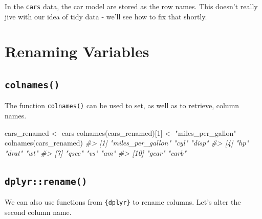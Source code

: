 \documentclass[
  12pt,
]{book}
\newenvironment{Shaded}{\begin{snugshade}}{\end{snugshade}}
\newcommand{\CommentTok}[1]{\textcolor[rgb]{0.56,0.35,0.01}{\textit{#1}}}
\newcommand{\DecValTok}[1]{\textcolor[rgb]{0.00,0.00,0.81}{#1}}
\newcommand{\FunctionTok}[1]{\textcolor[rgb]{0.00,0.00,0.00}{#1}}
\newcommand{\NormalTok}[1]{#1}
\newcommand{\OtherTok}[1]{\textcolor[rgb]{0.56,0.35,0.01}{#1}}
\newcommand{\StringTok}[1]{\textcolor[rgb]{0.31,0.60,0.02}{#1}}
\begin{document}
In the \texttt{cars} data, the car model are stored as the row names. This doesn't really jive with our idea of tidy data - we'll see how to fix that shortly.

\hypertarget{renaming-variables}{%
\section{Renaming Variables}\label{renaming-variables}}

\hypertarget{colnames}{%
\subsection{\texorpdfstring{\texttt{colnames()}}{colnames()}}\label{colnames}}

The function \texttt{colnames()} can be used to set, as well as to retrieve, column names.

\begin{Shaded}
\begin{Highlighting}[]
\NormalTok{cars\_renamed }\OtherTok{\textless{}{-}}\NormalTok{ cars }
\FunctionTok{colnames}\NormalTok{(cars\_renamed)[}\DecValTok{1}\NormalTok{] }\OtherTok{\textless{}{-}} \StringTok{"miles\_per\_gallon"}
\FunctionTok{colnames}\NormalTok{(cars\_renamed)}
\CommentTok{\#\textgreater{}  [1] "miles\_per\_gallon" "cyl"              "disp"            }
\CommentTok{\#\textgreater{}  [4] "hp"               "drat"             "wt"              }
\CommentTok{\#\textgreater{}  [7] "qsec"             "vs"               "am"              }
\CommentTok{\#\textgreater{} [10] "gear"             "carb"}
\end{Highlighting}
\end{Shaded}

\hypertarget{dplyrrename}{%
\subsection{\texorpdfstring{\texttt{dplyr::rename()}}{dplyr::rename()}}\label{dplyrrename}}

We can also use functions from \texttt{\{dplyr\}} to rename columns. Let's alter the second column name.
\end{document}
